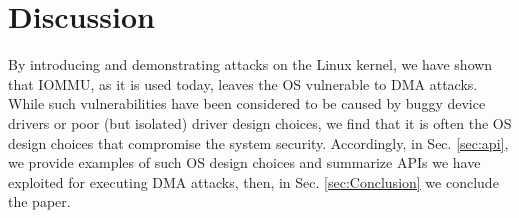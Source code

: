 

\section{Discussion}





By introducing and demonstrating \compound{} attacks on the Linux kernel, we have shown that IOMMU, as it is used today, leaves the OS vulnerable to DMA attacks. While such vulnerabilities have been considered to be caused by buggy device drivers or poor (but isolated) driver design choices, we find that it is often the OS design choices that compromise the system security.
Accordingly, in Sec. \ref{sec:api}, we provide examples of such OS design choices and summarize APIs we have exploited for executing \compound{} DMA attacks, %
then, in Sec. \ref{sec:Conclusion} we conclude the paper.

